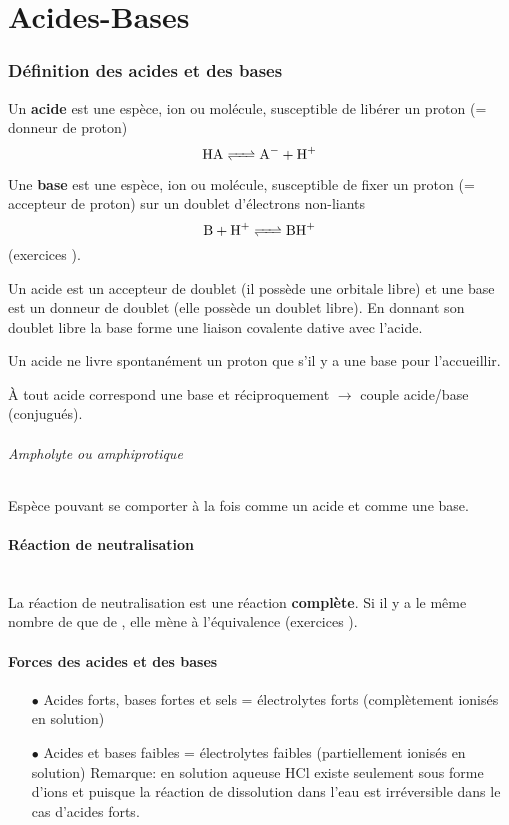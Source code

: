 \part{Acides-Bases}
\section{Définition des acides et des bases}



Un \textbf{acide} est une espèce, ion ou molécule, susceptible de libérer un proton  (= donneur de proton)
\[ \ce{HA <=> A- + H+} \]

Une \textbf{base} est une espèce, ion ou molécule, susceptible de fixer un proton  (= accepteur de proton) sur un doublet d'électrons non-liants
\[ \ce{B + H+ <=> BH+} \]
(exercices \cite[p.~6]{godard}).

Un acide est un accepteur de doublet (il possède une orbitale libre) et une base est un donneur de doublet (elle possède un doublet libre).
En donnant son doublet libre la base forme une liaison covalente dative avec l'acide.

Un acide ne livre spontanément un proton que s'il y a une base pour l'accueillir.

À tout acide correspond une base et réciproquement $\rightarrow$ couple acide/base (conjugués).

\paragraph{Ampholyte ou amphiprotique}
Espèce pouvant se comporter à la fois comme un acide et comme une base.

\subsection{Réaction de neutralisation}

\\

La réaction de neutralisation est une réaction \textbf{complète}.
Si il y a le même nombre de  que de , elle mène à l'équivalence (exercices \cite[p.~4]{godard}).

\subsection{Forces des acides et des bases}

\begin{itemize}
		\item[$\bullet$] Acides forts, bases fortes et sels = électrolytes forts (complètement ionisés en solution)
		\item[$\bullet$] Acides et bases faibles = électrolytes faibles (partiellement ionisés en solution)
		Remarque: en solution aqueuse HCl existe seulement sous forme d'ions  et  puisque la réaction de dissolution dans l'eau est irréversible dans le cas d'acides forts.
\end{itemize}

